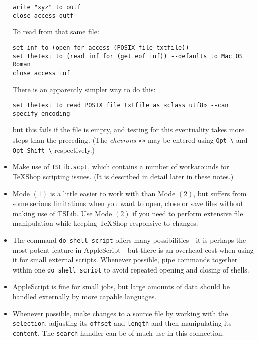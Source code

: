 \documentclass[11pt]{amsart}
\def\TeXShop{\TeX Shop\xspace}
\begin{document}
\begin{itemize}
\begin{verbatim}
write "xyz" to outf
close access outf
\end{verbatim}
To read from that same file:
\begin{verbatim}
set inf to (open for access (POSIX file txtfile))
set thetext to (read inf for (get eof inf)) --defaults to Mac OS Roman
close access inf
\end{verbatim}
There is an apparently simpler way to do this:
\begin{verbatim}
set thetext to read POSIX file txtfile as «class utf8» --can specify encoding
\end{verbatim}
but this fails if the file is empty, and testing for this eventuality takes more steps than the preceding. (The \emph{chevrons} \verb|«»| may be entered using \verb|Opt-\| and \verb|Opt-Shift-\| respectively.)
\item Make use of {\tt TSLib.scpt}, which contains a number of workarounds for \TeXShop scripting issues. (It is described in detail later in these notes.)
\item Mode $(1)$ is a little easier to work with than Mode $(2)$, but suffers from some serious limitations when you want to open, close or save files without making use of \textsf{TSLib}. Use Mode $(2)$ if you need to perform extensive file manipulation while keeping  \TeXShop responsive to changes.
\item The command {\tt do shell script} offers many possibilities---it is perhaps the most potent feature in AppleScript---but there is an overhead cost when using it for small external scripts. Whenever possible, pipe commands together within one {\tt do shell script} to avoid repeated opening and closing of shells.
\item AppleScript is fine for small jobs, but large amounts of data should be handled externally by more capable languages.
\item Whenever possible, make changes to a source file by working with the {\tt selection}, adjusting its {\tt offset} and {\tt length} and then manipulating its {\tt content}. The {\tt search} handler can be of much use in this connection.
\end{itemize}
\end{document}
